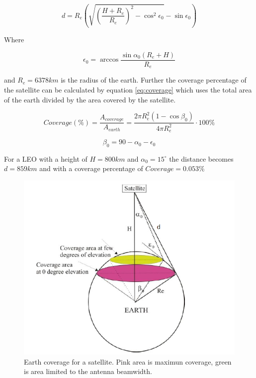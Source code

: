 \begin{equation}
d=R_e(\sqrt{(\frac{H+R_e}{R_e})^2-\cos^2{\epsilon_0}}-\sin{\epsilon_0})
\end{equation}
\label{eq:dist}

Where

\begin{equation}
\epsilon_0 = \arccos{\frac{\sin{\alpha_0}(R_e+H)}{R_e}}
\end{equation}
\label{eq:dist2}

and $R_e = 6378km$ is the radius of the earth. Further the coverage percentage of the satellite can be calculated by equation \ref{eq:coverage} which uses the total area of the earth divided by the area covered by the satellite. 

\begin{equation}
Coverage(\%) = \frac{A_{coverage}}{A_{earth}} = \frac{2 \pi R_e^2 ( 1 - \cos{\beta_0})}{4 \pi R_e^2}\cdot 100\%
\end{equation}
\label{eq:coverage} 

\begin{equation}
\beta_0 = 90 - \alpha_0 -\epsilon_0
\end{equation}

For a LEO with a height of $H = 800km$ and $\alpha_0 = 15^\circ$ the distance becomes $d = 859km$ and with a coverage percentage of $Coverage = 0.053 \%$

\begin{figure}[H]
\centering 
\includegraphics[scale = 0.7]{figures/linkbudget/sat_coverage.png}
\caption{Earth coverage for a satellite. Pink area is maximun coverage, green is area limited to the antenna beamwidth. \citep{Cakaj2014}}
\label{fig:cov_sat}
\end{figure} 

